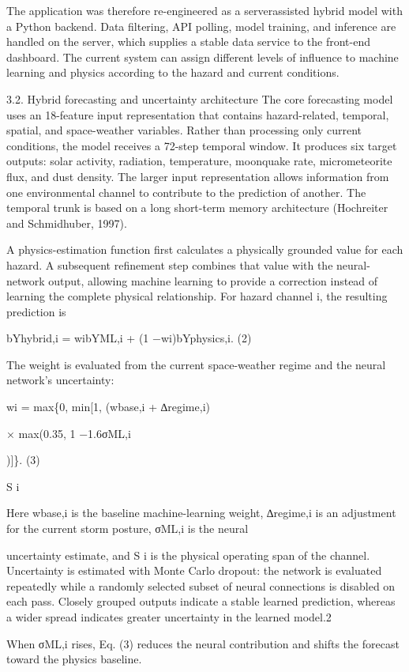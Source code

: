 The application was therefore re-engineered as a serverassisted hybrid model with a Python backend. Data filtering, API polling, model training, and inference are handled on the server, which supplies a stable data service to the front-end dashboard. The current system can assign different levels of influence to machine learning and physics according to the hazard and current conditions.

3.2. Hybrid forecasting and uncertainty architecture The core forecasting model uses an 18-feature input representation that contains hazard-related, temporal, spatial, and space-weather variables. Rather than processing only current conditions, the model receives a 72-step temporal window. It produces six target outputs: solar activity, radiation, temperature, moonquake rate, micrometeorite flux, and dust density. The larger input representation allows information from one environmental channel to contribute to the prediction of another. The temporal trunk is based on a long short-term memory architecture (Hochreiter and Schmidhuber, 1997).

A physics-estimation function first calculates a physically grounded value for each hazard. A subsequent refinement step combines that value with the neural-network output, allowing machine learning to provide a correction instead of learning the complete physical relationship. For hazard channel i, the resulting prediction is

bYhybrid,i = wibYML,i + (1 −wi)bYphysics,i. (2)

The weight is evaluated from the current space-weather regime and the neural network's uncertainty:

wi = max\{0, min{[}1, (wbase,i + ∆regime,i)

× max(0.35, 1 −1.6σML,i

){]}\}. (3)

S i

Here wbase,i is the baseline machine-learning weight, ∆regime,i is an adjustment for the current storm posture, σML,i is the neural

uncertainty estimate, and S i is the physical operating span of the channel. Uncertainty is estimated with Monte Carlo dropout: the network is evaluated repeatedly while a randomly selected subset of neural connections is disabled on each pass. Closely grouped outputs indicate a stable learned prediction, whereas a wider spread indicates greater uncertainty in the learned model.2

When σML,i rises, Eq. (3) reduces the neural contribution and shifts the forecast toward the physics baseline.

